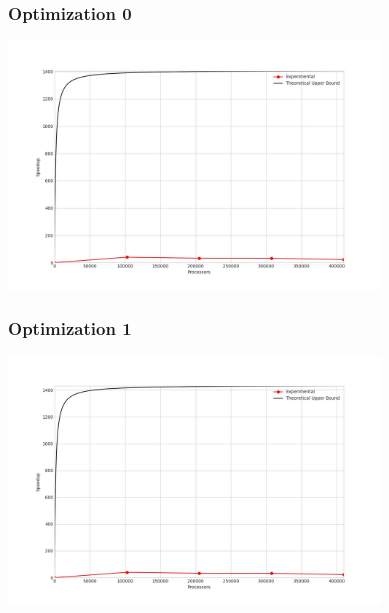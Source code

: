 \subsubsection{Optimization 0}
\begin{center}
    \resizebox{0.8\textwidth}{!}{}
    \includegraphics[width=0.74\textwidth]{../img/speedup-graph_type-tile-410000-O0}
\end{center}


\subsubsection{Optimization 1}
\begin{center}
    \resizebox{0.8\textwidth}{!}{}
    \includegraphics[width=0.74\textwidth]{../img/speedup-graph_type-tile-410000-O1}
\end{center}

\clearpage
